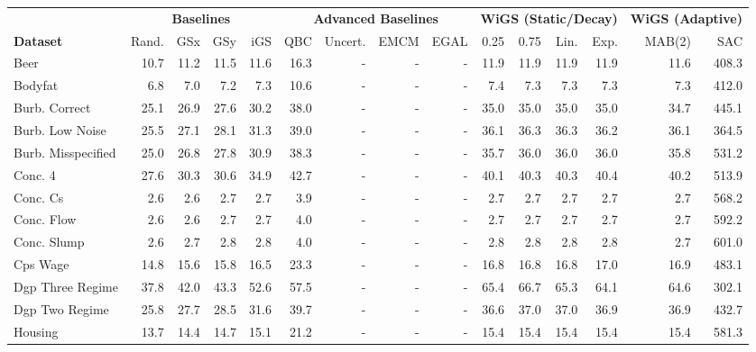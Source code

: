 \begin{table}[htbp]
    \centering
    \scriptsize
    \setlength{\tabcolsep}{2pt}
    \begin{tabular}{l rrrrrrrrrrrrrr}
        \toprule
         & \multicolumn{4}{c}{\textbf{Baselines}} & \multicolumn{4}{c}{\textbf{Advanced Baselines}} & \multicolumn{4}{c}{\textbf{WiGS (Static/Decay)}} & \multicolumn{2}{c}{\textbf{WiGS (Adaptive)}} \\
         \cmidrule(lr){2-5} \cmidrule(lr){6-9} \cmidrule(lr){10-13} \cmidrule(lr){14-15}
        \textbf{Dataset} & Rand. & GSx & GSy & iGS & QBC & Uncert. & EMCM & EGAL & 0.25 & 0.75 & Lin. & Exp. & MAB(2) & SAC \\ \midrule
        Beer & 10.7 & 11.2 & 11.5 & 11.6 & 16.3 & - & - & - & 11.9 & 11.9 & 11.9 & 11.9 & 11.6 & 408.3 \\
        Bodyfat & 6.8 & 7.0 & 7.2 & 7.3 & 10.6 & - & - & - & 7.4 & 7.3 & 7.3 & 7.3 & 7.3 & 412.0 \\
        Burb. Correct & 25.1 & 26.9 & 27.6 & 30.2 & 38.0 & - & - & - & 35.0 & 35.0 & 35.0 & 35.0 & 34.7 & 445.1 \\
        Burb. Low Noise & 25.5 & 27.1 & 28.1 & 31.3 & 39.0 & - & - & - & 36.1 & 36.3 & 36.3 & 36.2 & 36.1 & 364.5 \\
        Burb. Misspecified & 25.0 & 26.8 & 27.8 & 30.9 & 38.3 & - & - & - & 35.7 & 36.0 & 36.0 & 36.0 & 35.8 & 531.2 \\
        Conc. 4 & 27.6 & 30.3 & 30.6 & 34.9 & 42.7 & - & - & - & 40.1 & 40.3 & 40.3 & 40.4 & 40.2 & 513.9 \\
        Conc. Cs & 2.6 & 2.6 & 2.7 & 2.7 & 3.9 & - & - & - & 2.7 & 2.7 & 2.7 & 2.7 & 2.7 & 568.2 \\
        Conc. Flow & 2.6 & 2.6 & 2.7 & 2.7 & 4.0 & - & - & - & 2.7 & 2.7 & 2.7 & 2.7 & 2.7 & 592.2 \\
        Conc. Slump & 2.6 & 2.7 & 2.8 & 2.8 & 4.0 & - & - & - & 2.8 & 2.8 & 2.8 & 2.8 & 2.7 & 601.0 \\
        Cps Wage & 14.8 & 15.6 & 15.8 & 16.5 & 23.3 & - & - & - & 16.8 & 16.8 & 16.8 & 17.0 & 16.9 & 483.1 \\
        Dgp Three Regime & 37.8 & 42.0 & 43.3 & 52.6 & 57.5 & - & - & - & 65.4 & 66.7 & 65.3 & 64.1 & 64.6 & 302.1 \\
        Dgp Two Regime & 25.8 & 27.7 & 28.5 & 31.6 & 39.7 & - & - & - & 36.6 & 37.0 & 37.0 & 36.9 & 36.9 & 432.7 \\
        Housing & 13.7 & 14.4 & 14.7 & 15.1 & 21.2 & - & - & - & 15.4 & 15.4 & 15.4 & 15.4 & 15.4 & 581.3 \\

\end{tabular}
\end{table}
